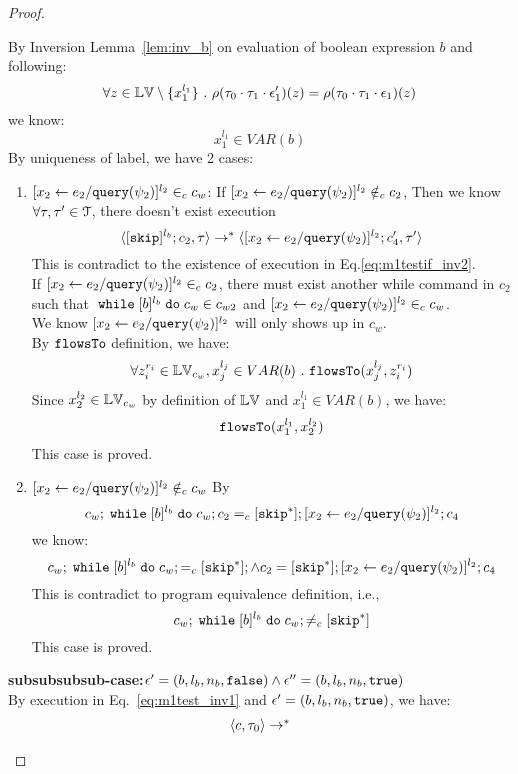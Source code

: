 {\begin{proof}
\begin{subproof}
\[ \]
By Inversion Lemma~\ref{lem:inv_b} on evaluation of boolean expression $b$ and following: 
\[
  \forall z \in \mathbb{LV} \setminus \{x_1^{l_1}\} ~.~
  \rho(\mathtt{\tau}_0 \cdot \mathtt{\tau}_1 \cdot \mathtt{\epsilon}_1')(z) = \rho(\mathtt{\tau}_0 \cdot \mathtt{\tau}_1 \cdot \mathtt{\epsilon}_1)(z)
\]
we know:
\[
  x_1^{l_1} \in VAR(b)
\]
%
 By uniqueness of label, we have 2 cases:
 \begin{enumerate}
 \item $[\mathrel{ {x}_2 \leftarrow e_2 / {\tt query}(\psi_2) }]^{l_2} \in_c c_w$:
 If $[\mathrel{ {x}_2 \leftarrow e_2 / {\tt query}(\psi_2) }]^{l_2} \notin_c c_2$,
 Then we know $\forall \mathtt{\tau}, \mathtt{\tau}' \in \mathcal{T}$, there doesn't exist execution
 \[
  \langle [\mathtt{skip}]^{l_b};c_2, \mathtt{\tau} \rangle \rightarrow^{*} 
  \langle [\mathrel{ {x}_2 \leftarrow e_2 / {\tt query}(\psi_2) }]^{l_2};{c}_4', \mathtt{\tau}' \rangle
 \]
 This is contradict to the existence of execution in Eq.\ref{eq:m1testif_inv2}.
 \\
  If $[\mathrel{ {x}_2 \leftarrow e_2 / {\tt query}(\psi_2) }]^{l_2} \in_c c_2$, there must exist another while command
   in $c_2$ such that 
  $\;\mathtt{while}\; [b]^{l_b} \;\mathtt{do}\; c_w \in c_{w2}$ and $[\mathrel{ {x}_2 \leftarrow e_2 / {\tt query}(\psi_2) }]^{l_2} \in_c c_w$.
  \\
  We know $[\mathrel{ {x}_2 \leftarrow e_2 / {\tt query}(\psi_2) }]^{l_2}$ will only shows up in $c_w$.
  \\
  By $\mathtt{flowsTo}$ definition, we have:
  \[
    \forall z_i^{r_i} \in \mathbb{LV}_{c_w}, x_j^{l_j} \in VAR(b) ~.~
    \mathtt{flowsTo}(x_j^{l_j}, z_i^{r_i})
  \]
  Since $x_2^{l_2} \in \mathbb{LV}_{c_w}$ by definition of $\mathbb{LV}$ and $x_1^{l_1} \in VAR(b)$, we have: 
  \[
    \mathtt{flowsTo}(x_1^{l_1}, x_2^{l_2})
  \]
  This case is proved.
 \item $[\mathrel{ {x}_2 \leftarrow e_2 / {\tt query}(\psi_2) }]^{l_2} \notin_c c_w$
 By
 \[
  c_w;\;\mathtt{while}\; [b]^{l_b} \;\mathtt{do}\; c_w; c_2 =_c [\mathtt{skip}^*]; [\mathrel{ {x}_2 \leftarrow e_2 / {\tt query}(\psi_2) }]^{l_2};{c}_4
\]
we know:
\[
  c_w;\;\mathtt{while}\; [b]^{l_b} \;\mathtt{do}\; c_w; =_c [\mathtt{skip}^*]; \land c_2 = [\mathtt{skip}^*]; [\mathrel{ {x}_2 \leftarrow e_2 / {\tt query}(\psi_2) }]^{l_2};{c}_4
\]
This is contradict to program equivalence definition, i.e.,
\[
  c_w;\;\mathtt{while}\; [b]^{l_b} \;\mathtt{do}\; c_w; \neq_c [\mathtt{skip}^*]
\]
This case is proved.
%
 \end{enumerate}
%
\textbf{subsubsubsub-case:}$\mathtt{\epsilon}' = (b, l_b, n_b, \mathtt{false}) \land \mathtt{\epsilon}'' = (b, l_b, n_b, \mathtt{true})$
\\
By execution in Eq.~\ref{eq:m1test_inv1} and $\mathtt{\epsilon}' = (b, l_b, n_b, \mathtt{true})$, we have:
\[
  \begin{array}{l}   
  \langle {c}, \mathtt{\tau}_0 \rangle \rightarrow^{*} 

\end{array}\]
\end{subproof}
\end{proof}}
